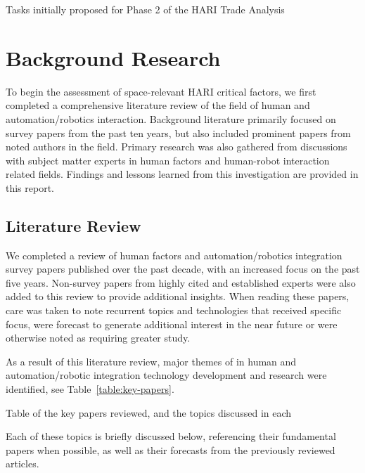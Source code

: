 \begin{table}[tb]
    \centering
    \caption{Tasks initially proposed for Phase 2 of the HARI Trade Analysis}
    \label{table:phase2}
\end{table}

\section{Background Research}
To begin the assessment of space-relevant HARI critical factors, we first completed a comprehensive literature review of the field of human and automation/robotics interaction.
Background literature primarily focused on survey papers from the past ten years, but also included prominent papers from noted authors in the field.
Primary research was also gathered from discussions with subject matter experts in human factors and human-robot interaction related fields.
Findings and lessons learned from this investigation are provided in this report.

\subsection{Literature Review}
We completed a review of human factors and automation/robotics integration survey papers published over the past decade, with an increased focus on the past five years.
Non-survey papers from highly cited and established experts were also added to this review to provide additional insights.
When reading these papers, care was taken to note recurrent topics and technologies that received specific focus, were forecast to generate additional interest in the near future or were otherwise noted as requiring greater study.

As a result of this literature review, major themes of in human and automation/robotic integration technology development and research were identified, see Table~\ref{table:key-papers}.

\begin{table}[tb]
    \centering
    \caption{Table of the key papers reviewed, and the topics discussed in each}
    \label{table:key-papers}
\end{table}

Each of these topics is briefly discussed below, referencing their fundamental papers when possible, as well as their forecasts from the previously reviewed articles.

